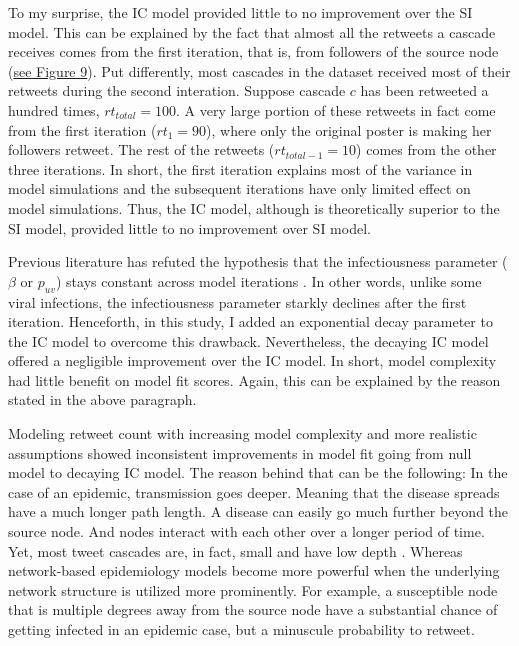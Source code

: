 \documentclass[11pt,a4paper]{article}
\begin{document}
    To my surprise, the IC model provided little to no improvement over the SI model. This can be explained by the fact that almost all the retweets a cascade receives comes from the first iteration, that is, from followers of the source node (\hyperlink{fig:ecdf-vs-iter}{see Figure 9}). Put differently, most cascades in the dataset received most of their retweets during the second interation. Suppose cascade $c$ has been retweeted a hundred times, $rt_{total} = 100$. A very large portion of these retweets in fact come from the first iteration ($rt_1 = 90$), where only the original poster is making her followers retweet. The rest of the retweets ($rt_{total-1} = 10$) comes from the other three iterations. In short, the first iteration explains most of the variance in model simulations and the subsequent iterations have only limited effect on model simulations. Thus, the IC model, although is theoretically superior to the SI model, provided little to no improvement over SI model.
    
    Previous literature has refuted the hypothesis that the infectiousness parameter ($\beta$ or $p_{uv}$) stays constant across model iterations \cite{goel_note_2015}. In other words, unlike some viral infections, the infectiousness parameter starkly declines after the first iteration. Henceforth, in this study, I added an exponential decay parameter to the IC model to overcome this drawback. Nevertheless, the decaying IC model offered a negligible improvement over the IC model. In short, model complexity had little benefit on model fit scores. Again, this can be explained by the reason stated in the above paragraph.
    
    Modeling retweet count with increasing model complexity and more realistic assumptions showed inconsistent improvements in model fit going from null model to decaying IC model. The reason behind that can be the following: In the case of an epidemic, transmission goes deeper. Meaning that the disease spreads have a much longer path length. A disease can easily go much further beyond the source node. And nodes interact with each other over a longer period of time. Yet, most tweet cascades are, in fact, small and have low depth \cite{goel_structural_2016}. Whereas network-based epidemiology models become more powerful when the underlying network structure is utilized more prominently. For example, a susceptible node that is multiple degrees away from the source node have a substantial chance of getting infected in an epidemic case, but a minuscule probability to retweet.
\end{document}
